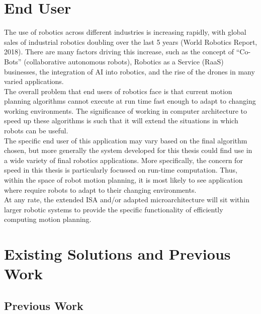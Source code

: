 \documentclass[11pt, oneside]{article}   	%
\begin{document}
\section{End User}
The use of robotics across different industries is increasing rapidly, with global sales of industrial robotics doubling over the last 5 years (World Robotics Report, 2018). There are many factors driving this increase, such as the concept of “Co-Bots” (collaborative autonomous robots), Robotics as a Service (RaaS) businesses, the integration of AI into robotics, and the rise of the drones in many varied applications.\\
The overall problem that end users of robotics face is that current motion planning algorithms cannot execute at run time fast enough to adapt to changing working environments. The significance of working in computer architecture to speed up these algorithms is such that it will extend the situations in which robots can be useful.\\
The specific end user of this application may vary based on the final algorithm chosen, but more generally the system developed for this thesis could find use in a wide variety of final robotics applications. More specifically, the concern for speed in this thesis is particularly focussed on run-time computation. Thus, within the space of robot motion planning, it is most likely to see application where require robots to adapt to their changing environments. \\
At any rate, the extended ISA and/or adapted microarchitecture will sit within larger robotic systems to provide the specific functionality of efficiently computing motion planning.

\section{Existing Solutions and Previous Work}

\subsection{Previous Work}
\end{document}
